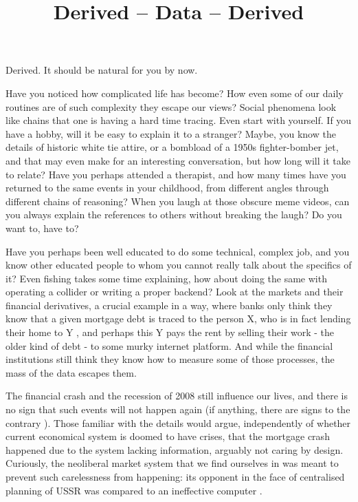\documentclass{article}
\title{Derived -- Data -- Derived}
\author{}
\begin{document}
\thispagestyle{empty}

\maketitle

\noindent Derived. It should be natural for you by now.




Have you noticed how complicated life has become? How even some of our daily routines are of such complexity they escape our views? Social phenomena look like chains that one is having a hard time tracing. Even start with yourself. If you have a hobby, will it be easy to explain it to a stranger? Maybe, you know the details of historic white tie attire, or a bombload of a 1950s fighter-bomber jet, and that may even make for an interesting conversation, but how long will it take to relate? Have you perhaps attended a therapist, and how many times have you returned to the same events in your childhood, from different angles through different chains of reasoning?
When you laugh at those obscure meme videos, can you always explain the references to others without breaking the laugh? Do you want to, have to?


Have you perhaps been well educated to do some technical, complex job, and you know other educated people to whom you cannot really talk about the specifics of it? Even fishing takes some time explaining, how about doing the same with operating a collider or writing a proper backend? Look at the markets and their financial derivatives, a crucial example in a way, where banks only think they know that a given mortgage debt is traced to the person X, who is in fact lending their home to Y \cite{BGSHT}, and perhaps this Y pays the rent by selling their work - the older kind of debt - to some murky internet platform. And while the financial institutions still think they know how to measure some of those processes, the mass of the data escapes them.

The financial crash and the recession of 2008 still influence our lives, and there is no sign that such events will not
happen again (if anything, there are signs to the contrary \cite{FORBES}). Those familiar with the details
\cite{BGSHT} would argue, independently of whether current economical system is doomed to have crises,
that the mortgage crash happened due to the system lacking information, arguably not caring by design.
Curiously, the neoliberal market system that we find ourselves in was meant to prevent such carelessness
from happening: its opponent in the face of centralised planning of USSR was compared to an ineffective computer \cite{DWIT}.
\end{document}
